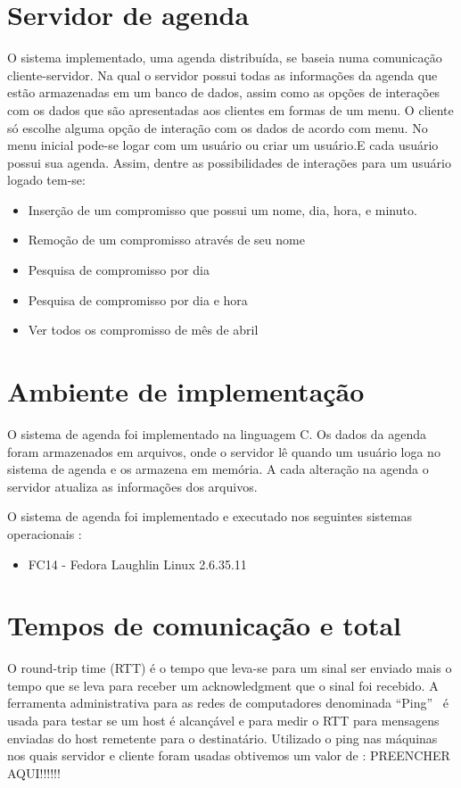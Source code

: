 \documentclass[10pt,a4paper]{article}
\begin{document}
\section{Servidor de agenda}
  O sistema implementado, uma agenda distribuída, se baseia numa comunicação
  cliente-servidor. Na qual o servidor possui todas as informações da
  agenda que estão armazenadas em um banco de dados,
  assim como as opções de interações com os dados que são apresentadas
  aos clientes em formas de um menu.
  O cliente só escolhe alguma opção de interação com os dados de
  acordo com menu.
  No menu inicial pode-se logar com um usuário ou criar um usuário.E cada
  usuário possui sua agenda. Assim, dentre as possibilidades de interações para um usuário logado tem-se:
  \begin{itemize}
  \item Inserção de um compromisso que possui um nome, dia, hora, e minuto. 
  \item Remoção de um compromisso através de seu nome
  \item Pesquisa de compromisso por dia
  \item Pesquisa de compromisso por dia e hora
  \item Ver todos os compromisso de mês de abril
  \end{itemize}
  
\section{Ambiente de implementação}
  O sistema de agenda foi implementado na linguagem C. Os dados da
  agenda foram armazenados em arquivos, onde o servidor lê quando um
  usuário loga no sistema de agenda e os armazena em memória. 
  A cada alteração na agenda o servidor atualiza as informações dos arquivos.

  O sistema de agenda foi implementado e executado nos seguintes sistemas operacionais :
  \begin{itemize}
  \item FC14 - Fedora Laughlin Linux 2.6.35.11
  \end{itemize}

\section{Tempos de comunicação e total}
O round-trip time (RTT) é o tempo que leva-se para um sinal ser
enviado mais o tempo que se leva para receber um acknowledgment que o
sinal foi recebido. A ferramenta administrativa para as redes de
computadores denominada ``Ping''~\cite{Ping} é usada para testar se um host é alcançável e para
medir o RTT para mensagens enviadas do host remetente para o
destinatário.
Utilizado o ping nas máquinas nos quais servidor e cliente foram
usadas obtivemos um valor de : PREENCHER AQUI!!!!!!
\end{document}
